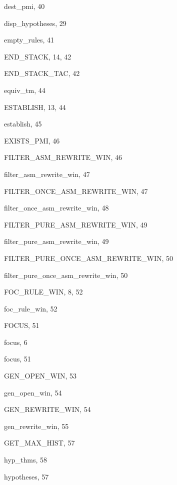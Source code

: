 \begin{theindex}
  \indexspace

  \item {\ptt dest\_pmi}, 40
  \item {\ptt disp\_hypotheses}, 29

  \indexspace

  \item {\ptt empty\_rules}, 41
  \item {\ptt END\_STACK}, 14, 42
  \item {\ptt END\_STACK\_TAC}, 42
  \item {\ptt equiv\_tm}, 44
  \item {\ptt ESTABLISH}, 13, 44
  \item {\ptt establish}, 45
  \item {\ptt EXISTS\_PMI}, 46

  \indexspace

  \item {\ptt FILTER\_ASM\_REWRITE\_WIN}, 46
  \item {\ptt filter\_asm\_rewrite\_win}, 47
  \item {\ptt FILTER\_ONCE\_ASM\_REWRITE\_WIN}, 47
  \item {\ptt filter\_once\_asm\_rewrite\_win}, 48
  \item {\ptt FILTER\_PURE\_ASM\_REWRITE\_WIN}, 49
  \item {\ptt filter\_pure\_asm\_rewrite\_win}, 49
  \item {\ptt FILTER\_PURE\_ONCE\_ASM\_REWRITE\_WIN}, 50
  \item {\ptt filter\_pure\_once\_asm\_rewrite\_win}, 50
  \item {\ptt FOC\_RULE\_WIN}, 8, 52
  \item {\ptt foc\_rule\_win}, 52
  \item {\ptt FOCUS}, 51
  \item focus, 6
  \item {\ptt focus}, 51

  \indexspace

  \item {\ptt GEN\_OPEN\_WIN}, 53
  \item {\ptt gen\_open\_win}, 54
  \item {\ptt GEN\_REWRITE\_WIN}, 54
  \item {\ptt gen\_rewrite\_win}, 55
  \item {\ptt GET\_MAX\_HIST}, 57

  \indexspace

  \item {\ptt hyp\_thms}, 58
  \item {\ptt hypotheses}, 57


\end{theindex}

